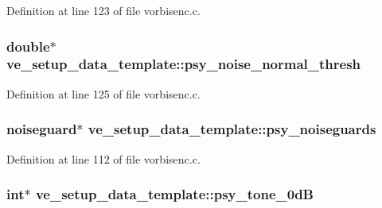 Definition at line 123 of file vorbisenc.\+c.

\subsubsection[{\texorpdfstring{psy\+\_\+noise\+\_\+normal\+\_\+thresh}{psy_noise_normal_thresh}}]{ double$\ast$ ve\+\_\+setup\+\_\+data\+\_\+template\+::psy\+\_\+noise\+\_\+normal\+\_\+thresh}\hypertarget{structve__setup__data__template_a178d559e9a7fa8a6f66f4905fad95574}{}\label{structve__setup__data__template_a178d559e9a7fa8a6f66f4905fad95574}


Definition at line 125 of file vorbisenc.\+c.

\subsubsection[{\texorpdfstring{psy\+\_\+noiseguards}{psy_noiseguards}}]{ {\bf noiseguard}$\ast$ ve\+\_\+setup\+\_\+data\+\_\+template\+::psy\+\_\+noiseguards}\hypertarget{structve__setup__data__template_a512e1938807fed002ecf014793828790}{}\label{structve__setup__data__template_a512e1938807fed002ecf014793828790}


Definition at line 112 of file vorbisenc.\+c.

\subsubsection[{\texorpdfstring{psy\+\_\+tone\+\_\+0dB}{psy_tone_0dB}}]{ {\bf int}$\ast$ ve\+\_\+setup\+\_\+data\+\_\+template\+::psy\+\_\+tone\+\_\+0dB}\hypertarget{structve__setup__data__template_a70b3bbc12b77811a19eca89af4697edf}{}\label{structve__setup__data__template_a70b3bbc12b77811a19eca89af4697edf}


